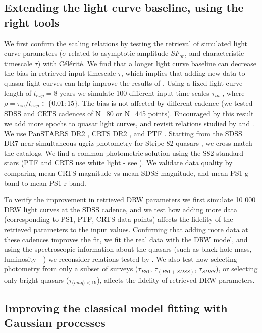 \documentclass[modern]{aastex62}
\begin{document}
\subsection{Extending the light curve baseline, using the right tools}
We first confirm the \cite{kozlowski2017a} scaling relations by testing the retrieval of simulated light curve parameters ($\sigma$ related to asymptotic amplitude $SF_{\infty}$, and characteristic timescale $\tau$) with C\'el\'erit\'e.  We find that a longer light curve baseline can decrease the bias in retrieved input timescale $\tau$, which implies that adding new data to quasar light curves can help improve the results of \cite{macleod2011}.  Using a fixed light curve length of $t_{exp} = 8$ years we simulate 100 different input time scales $\tau_{in}$ ,  where  $\rho = \tau_{in} / t_{exp} \in   \{ 0.01 : 15\}$.  The bias is not affected by different cadence (we tested SDSS and CRTS cadences of N=80 or N=445 points).
Encouraged by this result we add more epochs to quasar light curves, and revisit relations studied by  \cite{macleod2011} and \cite{hernitschek2016}. We use PanSTARRS \citep{chambers2011} DR2 \citep{flewelling2018}, CRTS DR2 \citep{drake2009}, and PTF \citep{rau2009}. Starting from the SDSS  DR7 near-simultaneous ugriz photometry for Stripe 82 quasars \citep{schneider2008}, we cross-match the catalogs. We find a common photometric solution using the S82 standard stars (PTF and CRTS use white light - see \citealt{djorgovski2011a}). We validate data quality by comparing mean CRTS magnitude vs mean SDSS magnitude, and mean PS1 g-band to mean PS1 r-band. 

To verify the improvement in retrieved DRW parameters we first simulate 10 000 DRW light curves at the SDSS cadence, and we test how adding more data (corresponding to PS1, PTF, CRTS data points) affects the fidelity of the retrieved parameters to the input values. Confirming that adding more data at these cadences improves the fit, we fit the real data with the DRW model, and using the spectroscopic information about the quasars (such as black hole mass, luminosity - \citealt{kelly2013}) we reconsider relations tested by \cite{macleod2011}.  We also test how selecting photometry from only a subset of surveys ($\tau_{PS1}$, $\tau_{(PS1+SDSS)}$,  $\tau_{SDSS}$), or selecting only bright quasars  ($\tau_{\langle mag\rangle<19}$), affects the fidelity of retrieved DRW parameters.

\subsection{Improving the classical model fitting with Gaussian processes}
\end{document}

